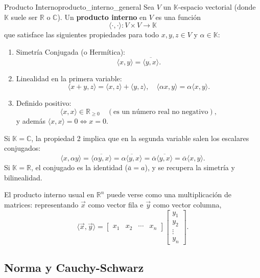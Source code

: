 \documentclass[11pt, a4paper]{article}
\begin{document}
\begin{definicion}{Producto Interno}{producto_interno_general}
Sea $V$ un $\mathbb{K}$-espacio vectorial (donde $\mathbb{K}$ suele ser $\mathbb{R}$ o $\mathbb{C}$). Un \textbf{producto interno} en $V$ es una función
\[
\langle \cdot , \cdot \rangle : V \times V \to \mathbb{K}
\]
que satisface las siguientes propiedades para todo $x, y, z \in V$ y $\alpha \in \mathbb{K}$:

\begin{enumerate}
    \item Simetría Conjugada (o Hermítica):
    \[
    \langle x, y \rangle = \overline{\langle y, x \rangle}.
    \]
    \item Linealidad en la primera variable:
    \[
    \langle x + y, z \rangle = \langle x, z \rangle + \langle y, z \rangle,
    \quad
    \langle \alpha x, y \rangle = \alpha \langle x, y \rangle.
    \]
    \item Definido positivo:
    \[
    \langle x, x \rangle \in \mathbb{R}_{\geq 0} \quad (\text{es un número real no negativo}),
    \]
    y además $\langle x, x \rangle = 0 \iff x = 0$.
\end{enumerate}
\end{definicion}

\obs Si $\mathbb{K} = \mathbb{C}$, la propiedad 2 implica que en la segunda variable salen los escalares conjugados:
\[
\langle x, \alpha y \rangle = \overline{\langle \alpha y, x \rangle} = \overline{\alpha \langle y, x \rangle} = \overline{\alpha} \overline{\langle y, x \rangle} = \overline{\alpha} \langle x, y \rangle.
\]
Si $\mathbb{K} = \mathbb{R}$, el conjugado es la identidad ($\bar{a} = a$), y se recupera la simetría y bilinealidad.

\obs El producto interno usual en $\mathbb{R}^n$ puede verse como una multiplicación de matrices: representando $\vec{x}$ como vector fila e $\vec{y}$ como vector columna,
\[
\langle \vec{x}, \vec{y} \rangle = 
\begin{bmatrix} x_1 & x_2 & \cdots & x_n \end{bmatrix}
\begin{bmatrix} y_1 \\ y_2 \\ \vdots \\ y_n \end{bmatrix}.
\]

\subsection{Norma y Cauchy-Schwarz}
\end{document}
